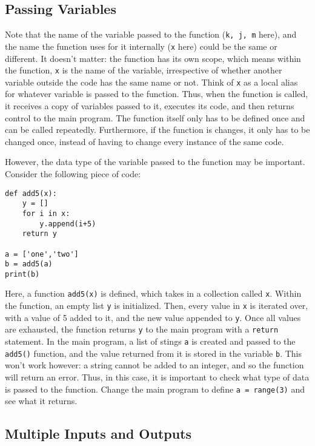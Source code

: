 \documentclass[12pt]{article}
\newcommand{\code}{\texttt}
\begin{document}
\subsection{Passing Variables} 

Note that the name of the variable passed to the function (\code{k, j, m} here), and the name the function uses for it internally (\code{x} here) could be the same or different. It doesn't matter: the function has its own scope, which means within the function, \code{x} is the name of the variable, irrespective of whether another variable outside the code has the same name or not. Think of \code{x} as a local alias for whatever variable is passed to the function. Thus, when the function is called, it receives a copy of variables passed to it, executes its code, and then returns control to the main program. The function itself only has to be defined once and can be called repeatedly. Furthermore, if the function is changes, it only has to be changed once, instead of having to change every instance of the same code.

However, the data type of the variable passed to the function may be important. Consider the following piece of code:

\begin{lstlisting}[frame=single] 
def add5(x):
    y = []
    for i in x:
        y.append(i+5)
    return y

a = ['one','two']
b = add5(a)
print(b)
\end{lstlisting}

Here, a function \code{add5(x)} is defined, which takes in a collection called \code{x}. Within the function, an empty list \code{y} is initialized. Then, every value in \code{x} is iterated over, with a value of 5 added to it, and the new value appended to \code{y}. Once all values are exhausted, the function returns \code{y} to the main program with a \code{return} statement. In the main program, a list of stings \code{a} is created and passed to the \code{add5()} function, and the value returned from it is stored in the variable \code{b}. This won't work however: a string cannot be added to an integer, and so the function will return an error. Thus, in this case, it is important to check what type of data is passed to the function. Change the main program to define \code{a = range(3)} and see what it returns. 

\subsection{Multiple Inputs and Outputs}
\end{document}
